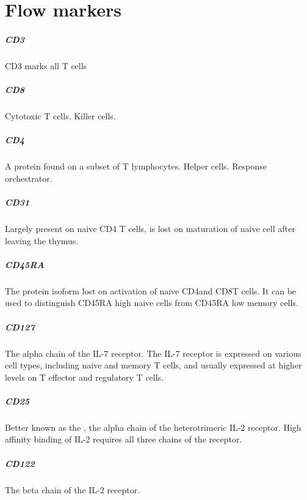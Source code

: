 \chapter{\label{appendix:flowsorting}{Flow markers}}


\paragraph{CD3}
CD3 marks all T cells

\paragraph{CD8}
Cytotoxic T cells. Killer cells.

\paragraph{CD4}
A protein found on a subset of T lymphocytes.
Helper cells.
Response orchestrator.

\paragraph{CD31}
Largely present on naive CD4 T cells, is lost on maturation of naive cell after leaving the thymus.

\paragraph{CD45RA}
The protein isoform lost on activation of naive CD4\positive and CD8\positive T cells.
It can be used to distinguish CD45RA high naive cells from CD45RA low memory cells.

\paragraph{CD127}
The alpha chain of the IL-7 receptor.
The IL-7 receptor is expressed on various cell types, including naive and memory T cells,
and usually expressed at higher levels on T effector and regulatory T cells.

\paragraph{CD25}
Better known as the , the alpha chain of the heterotrimeric IL-2 receptor.
High affinity binding of IL-2 requires all three chains of the receptor.

\paragraph{CD122}
The beta chain of the IL-2 receptor.

